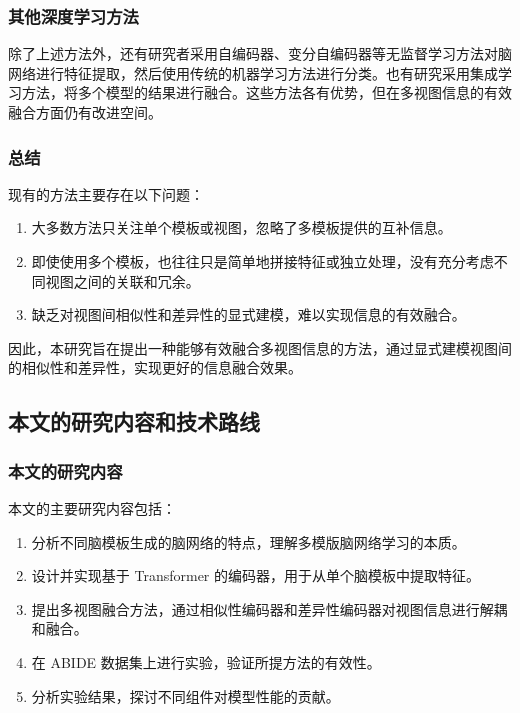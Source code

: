 \documentclass[12pt,a4paper]{article}
\begin{document}
\subsubsection{其他深度学习方法}

除了上述方法外，还有研究者采用自编码器、变分自编码器等无监督学习方法对脑网络进行特征提取，然后使用传统的机器学习方法进行分类。也有研究采用集成学习方法，将多个模型的结果进行融合。这些方法各有优势，但在多视图信息的有效融合方面仍有改进空间。

\subsubsection{总结}

现有的方法主要存在以下问题：

\begin{enumerate}
\item 大多数方法只关注单个模板或视图，忽略了多模板提供的互补信息。
\item 即使使用多个模板，也往往只是简单地拼接特征或独立处理，没有充分考虑不同视图之间的关联和冗余。
\item 缺乏对视图间相似性和差异性的显式建模，难以实现信息的有效融合。
\end{enumerate}

因此，本研究旨在提出一种能够有效融合多视图信息的方法，通过显式建模视图间的相似性和差异性，实现更好的信息融合效果。

\subsection{本文的研究内容和技术路线}

\subsubsection{本文的研究内容}

本文的主要研究内容包括：

\begin{enumerate}
\item 分析不同脑模板生成的脑网络的特点，理解多模版脑网络学习的本质。
\item 设计并实现基于 Transformer 的编码器，用于从单个脑模板中提取特征。
\item 提出多视图融合方法，通过相似性编码器和差异性编码器对视图信息进行解耦和融合。
\item 在 ABIDE 数据集上进行实验，验证所提方法的有效性。
\item 分析实验结果，探讨不同组件对模型性能的贡献。
\end{enumerate}
\end{document}
